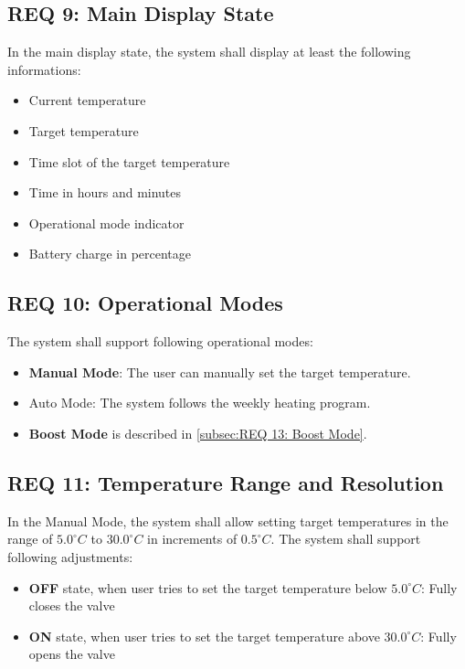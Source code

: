 \subsection*{REQ 9: Main Display State}
\label{subsec:REQ 9: Main Display State}
In the main display state, the system shall display at least the following informations:
\begin{itemize}
    \item Current temperature
    \item Target temperature
    \item Time slot of the target temperature
    \item Time in hours and minutes
    \item Operational mode indicator
    \item Battery charge in percentage
\end{itemize}

\subsection*{REQ 10: Operational Modes}
\label{subsec:REQ 10: Operational Modes}
The system shall support following operational modes:
\begin{itemize}
    \item \textbf{Manual Mode}: The user can manually set the target temperature.
    \item Auto Mode: The system follows the weekly heating program.
    \item \textbf{Boost Mode} is described in \ref{subsec:REQ 13: Boost Mode}.
\end{itemize}

\subsection*{REQ 11: Temperature Range and Resolution}
\label{subsec:REQ 11: Temperature Range and Resolution}
In the Manual Mode, the system shall allow setting target temperatures in the range of $5.0^\circ C$ to $30.0^\circ C$ in increments of $0.5^\circ C$. The system shall support following adjustments:
\begin{itemize}
    \item \textbf{OFF} state, when user tries to set the target temperature below $5.0^\circ C$: Fully closes the valve%
    \item \textbf{ON} state, when user tries to set the target temperature above $30.0^\circ C$: Fully opens the valve%
\end{itemize}

